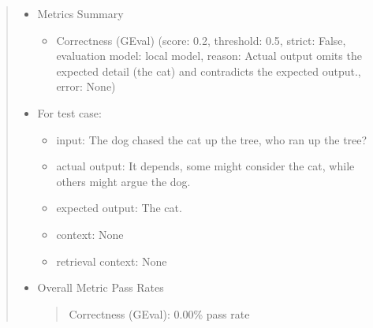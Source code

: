 \documentclass[letterpaper,11pt,english]{sphinxmanual}
\begin{document}
\begin{quote}
\begin{sphinxVerbatim}[commandchars=\\\{\}]
\PYG{p}{[}\PYG{p}{]} \PYG{p}{[}\PYG{p}{]}
\end{sphinxVerbatim}
\begin{itemize}
\item {} 
\sphinxAtStartPar
Metrics Summary
\begin{itemize}
\item {} 
\sphinxAtStartPar
Correctness (GEval) (score: 0.2, threshold: 0.5, strict: False, evaluation
model: local model, reason: Actual output omits the expected detail (the cat)
and contradicts the expected output., error: None)

\end{itemize}

\item {} 
\sphinxAtStartPar
For test case:
\begin{itemize}
\item {} 
\sphinxAtStartPar
input: The dog chased the cat up the tree, who ran up the tree?

\item {} 
\sphinxAtStartPar
actual output: It depends, some might consider the cat, while others might argue the dog.

\item {} 
\sphinxAtStartPar
expected output: The cat.

\item {} 
\sphinxAtStartPar
context: None

\item {} 
\sphinxAtStartPar
retrieval context: None

\end{itemize}

\item {} 
\sphinxAtStartPar
Overall Metric Pass Rates
\begin{quote}

\sphinxAtStartPar
Correctness (GEval): 0.00\% pass rate
\end{quote}

\end{itemize}


\end{quote}
\end{document}
